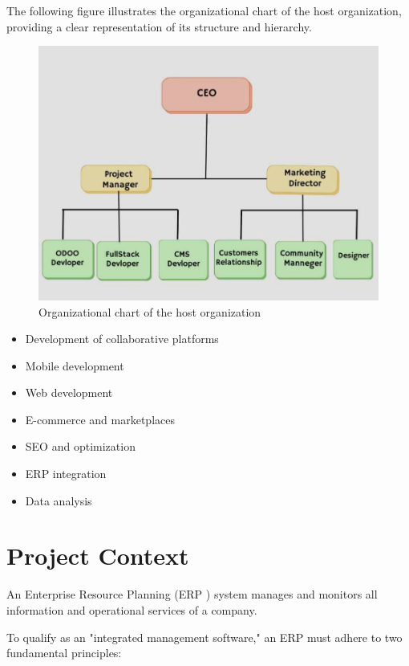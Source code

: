 The following figure illustrates the organizational chart of the host organization, providing a clear representation of its structure and hierarchy.

\begin{figure}[h]
    \centering
    \includegraphics[width=1\textwidth]{media/org.jpg}
    \caption{Organizational chart of the host organization}
    \label{fig:Organizational chart of the host organization}
\end{figure}

\begin{itemize}
    \item Development of collaborative platforms
    \item Mobile development
    \item Web development
    \item E-commerce and marketplaces
    \item SEO and optimization
    \item ERP integration
    \item Data analysis
\end{itemize}


\section{Project Context}

An Enterprise Resource Planning (ERP \cite{erp})  system manages and monitors all information and operational services of a company.

To qualify as an "integrated management software," an ERP must adhere to two fundamental principles:

